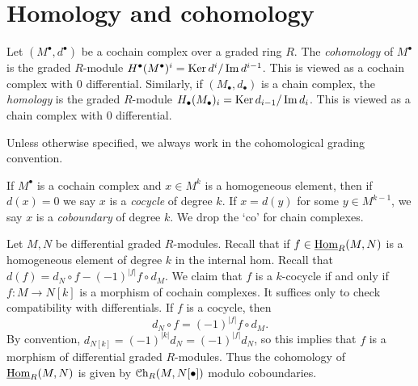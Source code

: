 \section{Homology and cohomology}

\begin{definition}\label{2.6.1}
	Let $(M^{\bullet},d^{\bullet} ) $ be a cochain complex over a graded ring $R$. The \emph{cohomology} of $M^{\bullet} $ is the graded $R$-module $H^{\bullet} (M^{\bullet} )^i = \operatorname{Ker} d^i / \operatorname{Im} d^{i-1} $. This is viewed as a cochain complex with 0 differential. Similarly, if $(M_{\bullet} ,d_{\bullet} )$ is a chain complex, the \emph{homology} is the graded $R$-module $H_{\bullet} (M_{\bullet} )_i = \operatorname{Ker} d_{i-1} / \operatorname{Im} d_{i} $. This is viewed as a chain complex with 0 differential.
\end{definition}

Unless otherwise specified, we always work in the cohomological grading convention.

\begin{terminology}\label{2.6.2}
	If $M^{\bullet} $ is a cochain complex and $x\in M^{k} $ is a homogeneous element, then if $d(x)=0$ we say $x$ is a \emph{cocycle} of degree $k$. If $x=d(y)$ for some $y\in M^{k-1} $, we say $x$ is a \emph{coboundary} of degree $k$. We drop the `co' for chain complexes.
\end{terminology}



\begin{remark}\label{2.6.3}
	Let $M,N$ be differential graded $R$-modules. Recall that if $f\in \underline{\operatorname{Hom}}_{R}(M, N) $ is a homogeneous element of degree $k$ in the internal hom. Recall that $d(f) = d_N\circ f- (-1)^{\left| f \right| } f\circ d_M$. We claim that $f$ is a $k$-cocycle if and only if $f : M \to N[k]$ is a morphism of cochain complexes. It suffices only to check compatibility with differentials. If $f$ is a cocycle, then
	\[
		d_N \circ f = (-1)^{\left| f \right| } f\circ d_M
	.\]
	By convention, $d_{N[k]} =(-1)^{\left| k \right| } d_N = (-1)^{\left| f \right| } d_N$, so this implies that $f$ is a morphism of differential graded $R$-modules. Thus the cohomology of $\underline{\operatorname{Hom}}_{R}(M, N) $ is given by $\mathcal{C}\mathrm{h}_{R} (M,N[\bullet])$ modulo coboundaries.
\end{remark}

